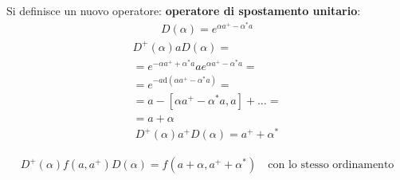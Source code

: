 Si definisce un nuovo operatore: \textbf{operatore di spostamento unitario}:
\begin{equation}\begin{split}
D\left(\alpha\right)=e^{\alpha a^+-\alpha^*a}
\end{split}\end{equation}
\begin{equation}\begin{split}
D^+\left(\alpha\right)aD\left(\alpha\right)=\\
=e^{-\alpha a^++\alpha^*a}ae^{\alpha a^+-\alpha^*a}=\\
=e^{-a\textrm{d}\left(\alpha a^+-\alpha^*a\right)}=\\
=a-\left[\alpha a^+-\alpha^*a, a\right]+\dots =\\
=a+\alpha
\end{split}\end{equation}
\begin{equation}\begin{split}
D^+\left(\alpha\right)a^+D\left(\alpha\right)=a^++\alpha^*
\end{split}\end{equation}

\begin{equation}\begin{split}
D^+\left(\alpha\right)f\left(a,a^+\right)D\left(\alpha\right)=f\left(a+\alpha,a^++\alpha^*\right) \quad \textrm{con lo stesso ordinamento}
\end{split}\end{equation}

